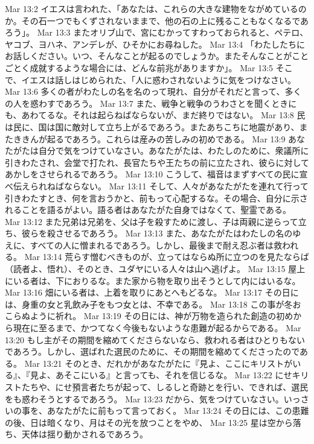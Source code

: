 Mar 13:2  イエスは言われた、「あなたは、これらの大きな建物をながめているのか。その石一つでもくずされないままで、他の石の上に残ることもなくなるであろう」。
Mar 13:3  またオリブ山で、宮にむかってすわっておられると、ペテロ、ヤコブ、ヨハネ、アンデレが、ひそかにお尋ねした。
Mar 13:4  「わたしたちにお話しください。いつ、そんなことが起るのでしょうか。またそんなことがことごとく成就するような場合には、どんな前兆がありますか」。
Mar 13:5  そこで、イエスは話しはじめられた、「人に惑わされないように気をつけなさい。
Mar 13:6  多くの者がわたしの名を名のって現れ、自分がそれだと言って、多くの人を惑わすであろう。
Mar 13:7  また、戦争と戦争のうわさとを聞くときにも、あわてるな。それは起らねばならないが、まだ終りではない。
Mar 13:8  民は民に、国は国に敵対して立ち上がるであろう。またあちこちに地震があり、またききんが起るであろう。これらは産みの苦しみの初めである。
Mar 13:9  あなたがたは自分で気をつけていなさい。あなたがたは、わたしのために、衆議所に引きわたされ、会堂で打たれ、長官たちや王たちの前に立たされ、彼らに対してあかしをさせられるであろう。
Mar 13:10  こうして、福音はまずすべての民に宣べ伝えられねばならない。
Mar 13:11  そして、人々があなたがたを連れて行って引きわたすとき、何を言おうかと、前もって心配するな。その場合、自分に示されることを語るがよい。語る者はあなたがた自身ではなくて、聖霊である。
Mar 13:12  また兄弟は兄弟を、父は子を殺すために渡し、子は両親に逆らって立ち、彼らを殺させるであろう。
Mar 13:13  また、あなたがたはわたしの名のゆえに、すべての人に憎まれるであろう。しかし、最後まで耐え忍ぶ者は救われる。
Mar 13:14  荒らす憎むべきものが、立ってはならぬ所に立つのを見たならば（読者よ、悟れ）、そのとき、ユダヤにいる人々は山へ逃げよ。
Mar 13:15  屋上にいる者は、下におりるな。また家から物を取り出そうとして内にはいるな。
Mar 13:16  畑にいる者は、上着を取りにあとへもどるな。
Mar 13:17  その日には、身重の女と乳飲み子をもつ女とは、不幸である。
Mar 13:18  この事が冬おこらぬように祈れ。
Mar 13:19  その日には、神が万物を造られた創造の初めから現在に至るまで、かつてなく今後もないような患難が起るからである。
Mar 13:20  もし主がその期間を縮めてくださらないなら、救われる者はひとりもないであろう。しかし、選ばれた選民のために、その期間を縮めてくださったのである。
Mar 13:21  そのとき、だれかがあなたがたに『見よ、ここにキリストがいる』、『見よ、あそこにいる』と言っても、それを信じるな。
Mar 13:22  にせキリストたちや、にせ預言者たちが起って、しるしと奇跡とを行い、できれば、選民をも惑わそうとするであろう。
Mar 13:23  だから、気をつけていなさい。いっさいの事を、あなたがたに前もって言っておく。
Mar 13:24  その日には、この患難の後、日は暗くなり、月はその光を放つことをやめ、
Mar 13:25  星は空から落ち、天体は揺り動かされるであろう。
